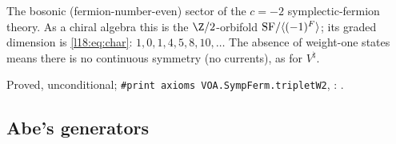 \begin{physics}
The bosonic (fermion-number-even) sector of the $c=-2$ symplectic-fermion theory. As a chiral algebra this
is the $\Z/2$-orbifold $\mathrm{SF}/\langle(-1)^F\rangle$; its graded dimension is \eqref{l18:eq:char}:
$1,0,1,4,5,8,10,\dots$ The absence of weight-one states means there is no continuous symmetry (no
currents), as for $V^\natural$.
\end{physics}
\begin{status}
Proved, unconditional; \texttt{\#print axioms VOA.SympFerm.tripletW2}, :
.
\end{status}

\subsection{Abe's generators}

